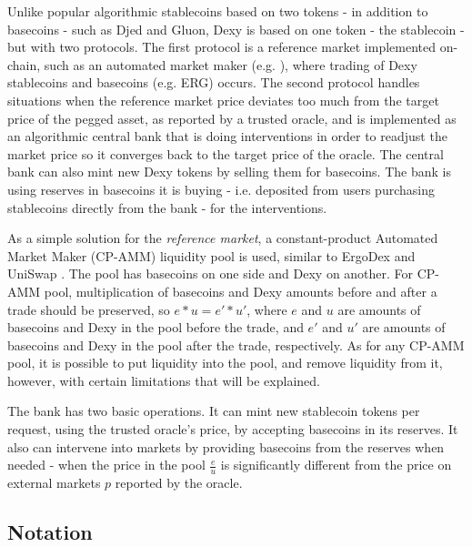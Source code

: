 \documentclass[a4paper,UKenglish,cleveref, autoref, thm-restate]{lipics-v2021}
\newcommand{\bc}{ERG}
\newcommand{\sct}{stablecoin}
\newcommand{\dx}{Dexy}
\begin{document}
Unlike popular algorithmic stablecoins based on two tokens - in addition to basecoins - such as Djed and Gluon, \dx{} is based on one token - the stablecoin - but with two protocols. The first protocol is a reference market implemented on-chain, such as an automated market maker (e.g. \cite{xu2021sok}), where trading of \dx{} stablecoins and basecoins  (e.g. \bc{}) occurs. The second protocol handles situations when the reference market price deviates too much from the target price of the pegged asset, as reported by a trusted oracle, and is implemented as an algorithmic central bank that is doing interventions in order to readjust the market price so it converges back to the target price of the oracle. The central bank can also mint new \dx{} tokens by selling them for basecoins. The bank is using reserves in basecoins it is buying - i.e. deposited from users purchasing stablecoins directly from the bank - for the interventions. 

As a simple solution for the {\em reference market}, a constant-product Automated Market Maker (CP-AMM) liquidity pool is used, similar to ErgoDex \cite{ErgoDex} and UniSwap \cite{Uniswap}. The pool has basecoins on one side and \dx{} on another. For CP-AMM pool, multiplication of basecoins and \dx{} amounts before and after a trade should be preserved, so $e * u = e' * u'$, where $e$ and $u$ are amounts of basecoins and \dx{} in the pool before the trade, and $e'$ and $u'$ are amounts of basecoins and \dx{} in the pool after the trade, respectively. As for any CP-AMM pool, it is possible to put liquidity into the pool, and remove liquidity from it, however, with certain limitations that will be explained.

The bank has two basic operations. It can mint new \sct{} tokens per request, using the trusted oracle's price, by accepting basecoins in its reserves. It also can intervene into markets by providing basecoins from the reserves when needed - when the price in the pool $\frac{e}{u}$ is significantly different from the price on external markets $p$ reported by the oracle.

\subsection{Notation}
\end{document}
